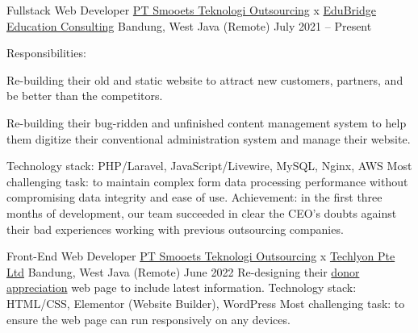 


\begin{cventries}


\cventry
{Fullstack Web Developer} %
{\href{https://www.smooets.com/}{PT Smooets Teknologi Outsourcing} x \href{https://www.edubridge.co.id/}{EduBridge Education Consulting}} %
{Bandung, West Java (Remote)} %
{July 2021 -- Present} %
{ %
Responsibilities:
\vspace{5mm}
\begin{cvitems}
\item {Re-building their old and static website to attract new customers, partners, and be better than the competitors.}
\item {Re-building their bug-ridden and unfinished content management system to help them digitize their conventional administration system and manage their website.}
\end{cvitems}
\vspace{4mm}
Technology stack: PHP/Laravel, JavaScript/Livewire, MySQL, Nginx, AWS
\linebreak
Most challenging task: to maintain complex form data processing performance without compromising data integrity and ease of use.
\linebreak
Achievement: in the first three months of development, our team succeeded in clear the CEO's doubts against their bad experiences working with previous outsourcing companies.
}

\cventry
{Front-End Web Developer} %
{\href{https://www.smooets.com/}{PT Smooets Teknologi Outsourcing} x \href{https://helloakin.com/}{Techlyon Pte Ltd}} %
{Bandung, West Java (Remote)} %
{June 2022} %
{ %
Re-designing their \href{https://giveblood.sg/donor-appreciation/}{donor appreciation} web page to include latest information.
\linebreak
Technology stack: HTML/CSS, Elementor (Website Builder), WordPress
\linebreak
Most challenging task: to ensure the web page can run responsively on any devices.
}


\end{cventries}
